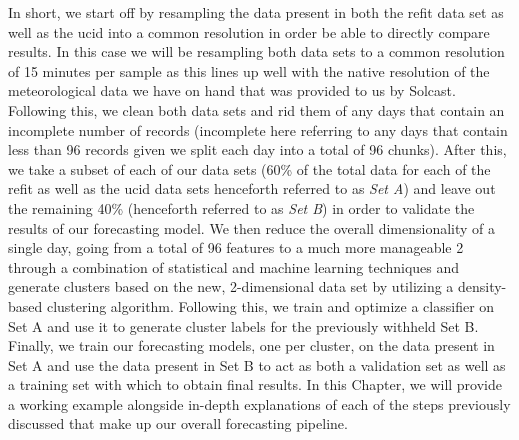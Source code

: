 \noindent \newline In short, we start off by resampling the data present in both the \gls{refit} data set as well as the \gls{ucid} into a common resolution in order be able to directly compare results. In this case we will be resampling both data sets to a common resolution of 15 minutes per sample as this lines up well with the native resolution of the meteorological data we have on hand that was provided to us by Solcast. Following this, we clean both data sets and rid them of any days that contain an incomplete number of records (incomplete here referring to any days that contain less than 96 records given we split each day into a total of 96 chunks). After this, we take a subset of each of our data sets (60\% of the total data for each of the \gls{refit} as well as the \gls{ucid} data sets henceforth referred to as \textit{Set A}) and leave out the remaining 40\% (henceforth referred to as \textit{Set B}) in order to validate the results of our forecasting model. We then reduce the overall dimensionality of a single day, going from a total of 96 features to a much more manageable 2 through a combination of statistical and machine learning techniques and generate clusters based on the new, 2-dimensional data set by utilizing a density-based clustering algorithm. Following this, we train and optimize a classifier on Set A and use it to generate cluster labels for the previously withheld Set B. Finally, we train our forecasting models, one per cluster, on the data present in Set A and use the data present in Set B to act as both a validation set as well as a training set with which to obtain final results. In this Chapter, we will provide a working example alongside in-depth explanations of each of the steps previously discussed that make up our overall forecasting pipeline.

